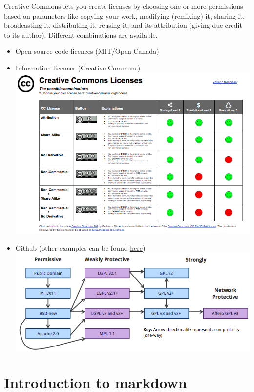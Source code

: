 \documentclass[
  12pt,
]{book}
\begin{document}
Creative Commons lets you create licenses by choosing one or more permissions based on parameters like copying your work, modifying (remixing) it, sharing it, broadcasting it, distributing it, reusing it, and its attribution (giving due credit to its author). Different combinations are available.

\begin{itemize}
\item
  Open source code licences (MIT/Open Canada)
\item
  Information licences (Creative Commons)
  \includegraphics{rr-presentation-figure/cc.png}
\item
  Github (other examples can be found \href{https://2015.igem.org/Team:Cambridge-JIC/OpenHardwareRevolution}{here})
  \includegraphics{rr-presentation-figure/opensource.png}
\end{itemize}

\hypertarget{introduction-to-markdown}{%
\chapter{Introduction to markdown}\label{introduction-to-markdown}}
\end{document}
